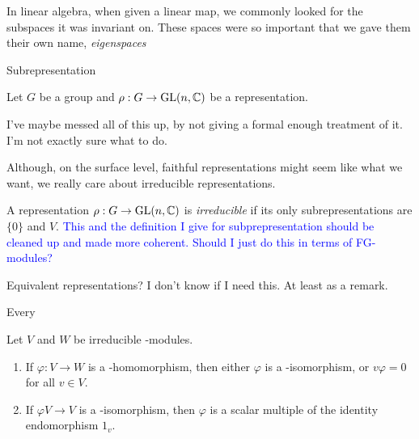 In linear algebra, when given a linear map, we commonly looked for the subspaces it was invariant on. These spaces 
were so important that we gave them their own name, \emph{eigenspaces}

\begin{definition}
    Subrepresentation

    Let $G$ be a group and $\rho : G \rightarrow \operatorname{GL}(n, \mathbb{C})$ be a representation. 

    I've maybe messed all of this up, by not giving a formal enough treatment of it. I'm not exactly sure what to 
    do.

\end{definition}


Although, on the surface level, faithful representations might seem like what we want, we really care about 
irreducible representations.



\begin{definition}
    A representation $\rho : G \rightarrow \operatorname{GL}(n, \mathbb{C})$ is \emph{irreducible} if its only subrepresentations are 
    $\{0\}$ and $V$. \textcolor{blue}{This and the definition I give for subprepresentation should be cleaned up 
    and made more coherent. Should I just do this in terms of FG-modules?}
\end{definition}



\begin{definition}
    Equivalent representations? I don't know if I need this. At least as a remark.
\end{definition}


\begin{theorem}
    Every 
\end{theorem}

\begin{theorem}
    Let $V$ and $W$ be irreducible \CG-modules.

    \begin{enumerate}
        \item If $\varphi : V \rightarrow W$ is a \CG-homomorphism, then either $\varphi$ is a \CG-isomorphism, or 
            $v\varphi = 0$ for all $v \in V$. 
            
        \item If $\varphi V \rightarrow V$ is a \CG-isomorphism, then $\varphi$ is a scalar multiple of the 
            identity endomorphism $1_v$.
    \end{enumerate}
\end{theorem}

